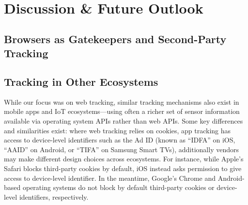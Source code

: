\section{Discussion \& Future Outlook}
\label{sec:future-outlook}




\subsection{Browsers as Gatekeepers and Second-Party Tracking}


\subsection{Tracking in Other Ecosystems}

While our focus was on web tracking, similar tracking mechanisms also exist in mobile apps and IoT ecosystems---using often a richer set of sensor information available via operating system APIs rather than web APIs. Some key differences and similarities exist: where web tracking relies on cookies, app tracking has access to device-level identifiers such as the Ad ID (known as ``IDFA'' on iOS, ``AAID'' on Android, or ``TIFA'' on Samsung Smart TVs), additionally vendors may make different design choices across ecosystems. For instance, while Apple's Safari blocks third-party cookies by default, iOS instead asks permission  to give access to device-level identifier. In the meantime, Google's Chrome and Android-based operating systems do not block by default third-party cookies or device-level identifiers, respectively.  



